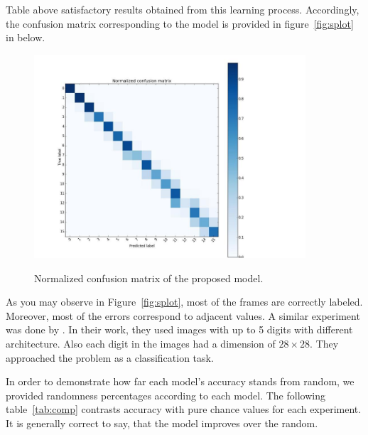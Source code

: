 Table above satisfactory results obtained from this learning process. Accordingly, the confusion matrix corresponding to the model is provided in figure~\ref{fig:splot} in below.

\begin{figure}[H]
	\centering
	{\includegraphics[width=0.9\textwidth]{images/normCM}}
	\caption{Normalized confusion matrix of the proposed model.}
	\label{conf}
\end{figure}


As you may observe in Figure~\ref{fig:splot}, most of the frames are correctly labeled. Moreover, most of the errors correspond to adjacent values. A similar experiment was done by \citeauthor*{segui2015learning}. In their work, they used images with up to 5 digits with different architecture. Also each digit in the images had a dimension of $28\times28$. They approached the problem as a classification task. 


In order to demonstrate how far each model's accuracy stands from random, we provided randomness percentages according to each model. The following table~\ref{tab:comp} contrasts accuracy with pure chance values for each experiment. It is generally correct to say, that the model improves over the random.

